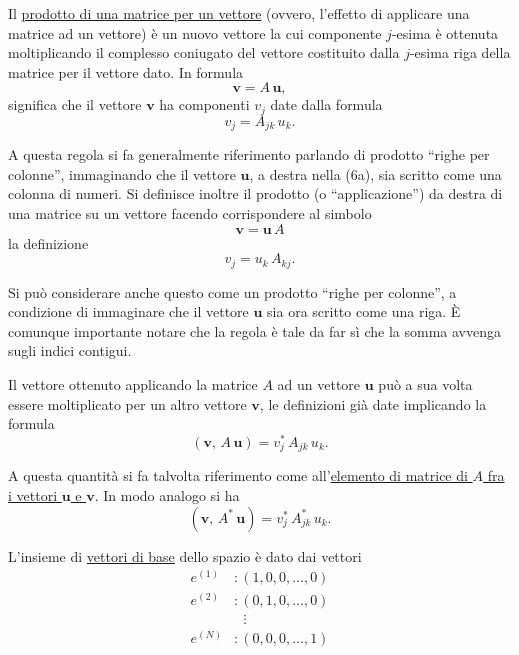\documentclass[11pt, a4paper]{book}
\numberwithin{equation}{section}
\begin{document}
Il \uline{prodotto di una matrice per un vettore} (ovvero, l'effetto di applicare una matrice ad un vettore) è un nuovo vettore la cui componente $j$-esima è ottenuta moltiplicando il complesso coniugato del vettore costituito dalla $j$-esima riga della matrice per il vettore dato. In formula
\begin{equation}
    \mathbf{v} = A\,\mathbf{u},
    \tag{6a}
\end{equation}
significa che il vettore $\mathbf{v}$ ha componenti $v_j$ date dalla formula
\begin{equation}
    v_j = A_{jk}\, u_k.
    \tag{6b}
\end{equation}

A questa regola si fa generalmente riferimento parlando di prodotto ``righe per colonne'', immaginando che il vettore $\mathbf{u}$, a destra nella (6a), sia scritto come una colonna di numeri. Si definisce inoltre il prodotto (o ``applicazione'') da destra di una matrice su un vettore facendo corrispondere al simbolo
\begin{equation}
    \mathbf{v} = \mathbf{u}\,A
    \tag{6c}
\end{equation}
la definizione
\begin{equation}
    v_j = u_k\, A_{kj}.
    \tag{6d}
\end{equation}

Si può considerare anche questo come un prodotto ``righe per colonne'', a condizione di immaginare che il vettore $\mathbf{u}$ sia ora scritto come una riga. È comunque importante notare che la regola è tale da far sì che la somma avvenga sugli indici contigui.

Il vettore ottenuto applicando la matrice $A$ ad un vettore $\mathbf{u}$ può a sua volta essere moltiplicato per un altro vettore $\mathbf{v}$, le definizioni già date implicando la formula
\begin{equation}
    \left( \mathbf{v},\, A\,\mathbf{u} \right) = v_j^*\, A_{jk}\, u_k.
    \tag{7a}
\end{equation}

A questa quantità si fa talvolta riferimento come all'\uline{elemento di matrice di $A$ fra i vettori $\mathbf{u}$ e $\mathbf{v}$}. In modo analogo si ha
\begin{equation}
    \left( \mathbf{v},\, A^*\,\mathbf{u} \right) = v_j^*\, A_{jk}^*\, u_k.
    \tag{7b}
\end{equation}

L'insieme di \uline{vettori di base} dello spazio è dato dai vettori
\begin{align*}
    e^{(1)} &: (1, 0, 0, \ldots, 0) \\
    e^{(2)} &: (0, 1, 0, \ldots, 0) \\
    &\phantom{:}\ \vdots \\
    e^{(N)} &: (0, 0, 0, \ldots, 1)
\end{align*}
\begin{equation}
    \tag{8a}
\end{equation}
\end{document}
